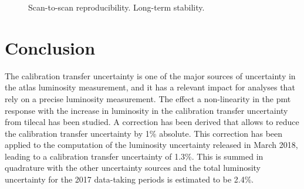 \begin{figure}[htbp]
\centering
{}
\caption{ Scan-to-scan reproducibility.  Long-term stability.}
\label{fig:apppmt:othersyst}
\end{figure}


\section{Conclusion}

The calibration transfer uncertainty is one of the major sources of uncertainty in the \gls{atlas} luminosity 
measurement, and it has a relevant impact for analyses that rely on a precise luminosity measurement. 
The effect a non-linearity in the \gls{pmt} response with the increase in luminosity in the calibration transfer uncertainty from 
\gls{tilecal} has been studied. 
A correction has been derived that allows to reduce the calibration transfer uncertainty by 1\% absolute.
This correction has been applied to the computation of the luminosity uncertainty released in March 2018, 
leading to a calibration transfer uncertainty of 1.3\%. 
This is summed in quadrature with the other uncertainty sources and 
the total luminosity uncertainty for the 2017 data-taking periods is estimated to be 2.4\%. 




